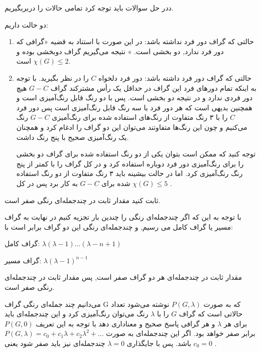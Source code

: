 \documentclass[11pt,largemargins]{h2wp}
\begin{document}
\Enote
ددر حل سوالات باید توجه کرد تمامی حالات را دربربگیریم.
 

دو حالت داریم:
\begin{enumerate}
\item
حالتی که گراف دور فرد نداشته باشد: 
در این صورت با استناد به قضیه «گرافی که دور فرد ندارد, دو بخشی است.
» نتیجه می‌گیریم گراف دوبخشی بوده و 
 $\chi (G) \leq 2$
 است.
\item 
حالتی که گراف دور فرد داشته باشد:
دور فرد دلخواه $C$ را در نظر بگیرید. با توجه به اینکه تمام دورهای فرد این گراف در حداقل یک رأس مشترکند گراف $G-C$ هیچ دور فردی ندارد و در نتیجه دو بخشی است. پس با دو رنگ قابل رنگ‌آمیزی است
و همچنین بدیهی است که هر دور فرد با سه رنگ قابل رنگ‌آمیزی است پس دور فرد
$C$
را با ۳ رنگ متفاوت از رنگ‌‌های استفاده شده برای رنگ‌آمیزی
$G-C$
رنگ می‌کنیم
 و چون این رنگ‌ها متفاوتند می‌توان این دو گراف را ادغام کرد و همچنان یک رنگ‌آمیزی صحیح  با پنج رنگ داشت.
 
 توجه کنید که ممکن است بتوان یکی از دو رنگ استفاده شده برای گراف دو بخشی را برای رنگ‌آمیزی دور فرد دوباره استفاده کرد و در کل گراف را با کمتر از پنج رنگ رنگ‌آمیزی کرد. اما در حالت بیشینه باید ۳ رنگ متفاوت از دو رنگ استفاده شده برای $G-C$ به کار برد
 پس در کل
 $\chi (G) \leq 5$ 
.
\end{enumerate}

\question
ثابت کنید مقدار ثابت در چندجمله‌ای رنگی صفر است.

\solution
با توجه به این که اگر چند‌جمله‌ای رنگی را چندین بار تجزیه کنیم در نهایت به گراف مسیر یا گراف کامل می رسیم, و چند‌جمله‌ای رنگی این دو گراف برابر است با:
\begin{center}
گراف کامل:
$\lambda(\lambda-1)...(\lambda-n+1)$

گراف مسیر:
$\lambda(\lambda-1)^{n-1}$
\end{center}

مقدار ثابت در چند‌جمله‌ای هر دو گراف صفر است, پس مقدار ثابت در چند‌جمله‌ای رنگی صفر است.
\notes


می‌دانیم چند جمله‌ای رنگی گراف G که به صورت $P(G,\lambda)$ نوشته می‌شود تعداد حالاتی‌ است که گراف $G$ را با $\lambda$ رنگ می‌توان رنگ‌آمیزی کرد و این چندجمله‌ای باید برای هر $\lambda$ و هر گرافی  پاسخ صحیح و معناداری دهد با توجه به این تعریف $P(G,0)$ برابر صفر خواهد بود. اگر این چندجمله‌ای به صورت
$P(G,\lambda)=c_0+c_1\lambda+c_2\lambda^2+...$
باشد.  پس با جایگذاری $\lambda=0$ چندجمله‌ای نیز باید صفر شود یعنی
$c_0=0$
.
\end{document}
